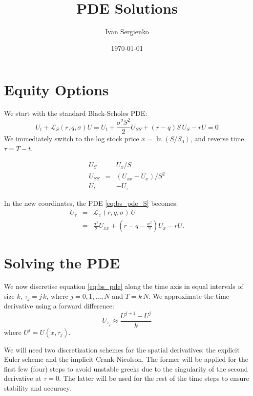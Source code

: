 \documentclass[11pt, letterpaper]{article}
\title{PDE Solutions}
\author{Ivan Sergienko}
\date{\today}
\begin{document}
    \maketitle

    \section{Equity Options}\label{sec:eq_opt}

    We start with the standard Black-Scholes PDE:
    \begin{equation}\label{eq:bs_pde_S}
        U_t + \mathcal{L}_S(r, q, \sigma)U = U_t + \frac{\sigma^2 S^2}{2} U_{SS} + (r - q) S\, U_S - r U = 0
    \end{equation}
    We immediately switch to the log stock price $x = \ln (S/S_0)$, and reverse time $\tau = T -t$.

    \begin{eqnarray}
        U_S &=& U_x / S \nonumber\\
        U_{SS} &=& (U_{xx} - U_x) / S^2\\
        U_t &=& -U_\tau \nonumber
    \end{eqnarray}

    In the new coordinates, the PDE \eqref{eq:bs_pde_S} becomes:
    \begin{eqnarray}
        U_\tau &=& \mathcal{L}_x(r, q, \sigma)\, U \label{eq:bs_pde}\\
        &=& \frac{\sigma^2}{2} U_{xx} + \left(r - q - \frac{\sigma^2}{2}\right) U_x - r U.\label{eq:bs_pde_detail}
    \end{eqnarray}

    \section{Solving the PDE}\label{sec:solving_pde}
    We now discretise equation \eqref{eq:bs_pde} along the time axis in equal intervals of size $k$, $\tau_j = j\, k$,
    where $j = 0, 1, \ldots, N$ and $T=k\, N$.
    We approximate the time derivative using a forward difference:
    \begin{equation}
        U_{\tau_j} \approx \frac{U^{j+1} - U^j}{k}
    \end{equation}
    where $U^j = U(x, \tau_j)$.
    
    We will need two discretization schemes for the spatial derivatives: the explicit Euler scheme and the implicit Crank-Nicolson.
    The former will be applied for the first few (four) steps to avoid unstable greeks due to the singularity of the second derivative
    at $\tau = 0$. The latter will be used for the rest of the time steps to ensure stability and accuracy.
\end{document}
